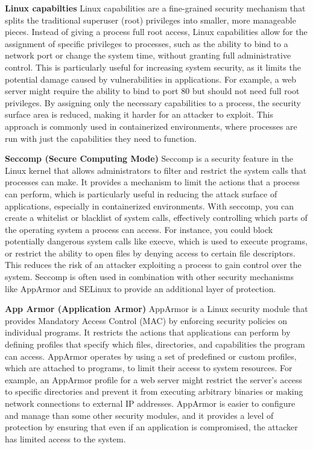\textbf{Linux capabilties}
Linux capabilities are a fine-grained security mechanism that splits the traditional superuser (root) privileges into smaller, more manageable pieces. Instead of giving a process full root access, Linux capabilities allow for the assignment of specific privileges to processes, such as the ability to bind to a network port or change the system time, without granting full administrative control. This is particularly useful for increasing system security, as it limits the potential damage caused by vulnerabilities in applications. For example, a web server might require the ability to bind to port 80 but should not need full root privileges. By assigning only the necessary capabilities to a process, the security surface area is reduced, making it harder for an attacker to exploit. This approach is commonly used in containerized environments, where processes are run with just the capabilities they need to function.

\textbf{Seccomp (Secure Computing Mode)}
Seccomp is a security feature in the Linux kernel that allows administrators to filter and restrict the system calls that processes can make. It provides a mechanism to limit the actions that a process can perform, which is particularly useful in reducing the attack surface of applications, especially in containerized environments. With seccomp, you can create a whitelist or blacklist of system calls, effectively controlling which parts of the operating system a process can access. For instance, you could block potentially dangerous system calls like execve, which is used to execute programs, or restrict the ability to open files by denying access to certain file descriptors. This reduces the risk of an attacker exploiting a process to gain control over the system. Seccomp is often used in combination with other security mechanisms like AppArmor and SELinux to provide an additional layer of protection.

\textbf{App Armor (Application Armor)}
AppArmor is a Linux security module that provides Mandatory Access Control (MAC) by enforcing security policies on individual programs. It restricts the actions that applications can perform by defining profiles that specify which files, directories, and capabilities the program can access. AppArmor operates by using a set of predefined or custom profiles, which are attached to programs, to limit their access to system resources. For example, an AppArmor profile for a web server might restrict the server’s access to specific directories and prevent it from executing arbitrary binaries or making network connections to external IP addresses. AppArmor is easier to configure and manage than some other security modules, and it provides a level of protection by ensuring that even if an application is compromised, the attacker has limited access to the system.

